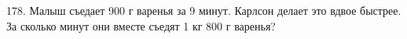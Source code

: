 178. Малыш съедает 900 г варенья за 9 минут. Карлсон делает это вдвое быстрее. За сколько минут они вместе съедят  1 кг 800 г варенья?\\
